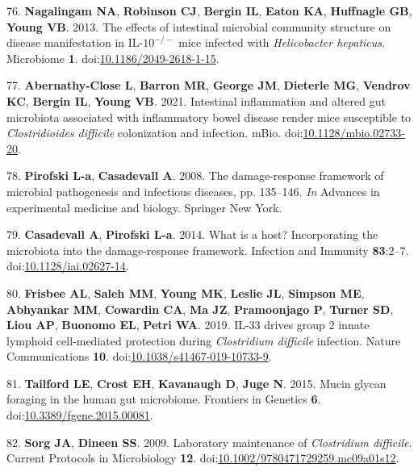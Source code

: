 \documentclass[
  12pt,
]{article}
\newenvironment{cslreferences}%
  {}%
  {\par}
\begin{document}
\begin{cslreferences}
\leavevmode\hypertarget{ref-Nagalingam2013}{}%
76. \textbf{Nagalingam NA}, \textbf{Robinson CJ}, \textbf{Bergin IL},
\textbf{Eaton KA}, \textbf{Huffnagle GB}, \textbf{Young VB}. 2013. The
effects of intestinal microbial community structure on disease
manifestation in IL-\(10^{-/-}\) mice infected with \emph{Helicobacter
hepaticus}. Microbiome \textbf{1}.
doi:\href{https://doi.org/10.1186/2049-2618-1-15}{10.1186/2049-2618-1-15}.

\leavevmode\hypertarget{ref-AbernathyClose2021}{}%
77. \textbf{Abernathy-Close L}, \textbf{Barron MR}, \textbf{George JM},
\textbf{Dieterle MG}, \textbf{Vendrov KC}, \textbf{Bergin IL},
\textbf{Young VB}. 2021. Intestinal inflammation and altered gut
microbiota associated with inflammatory bowel disease render mice
susceptible to \emph{Clostridioides difficile} colonization and
infection. mBio.
doi:\href{https://doi.org/10.1128/mbio.02733-20}{10.1128/mbio.02733-20}.

\leavevmode\hypertarget{ref-Pirofski2008}{}%
78. \textbf{Pirofski L-a}, \textbf{Casadevall A}. 2008. The
damage-response framework of microbial pathogenesis and infectious
diseases, pp. 135--146. \emph{In} Advances in experimental medicine and
biology. Springer New York.

\leavevmode\hypertarget{ref-Casadevall2014}{}%
79. \textbf{Casadevall A}, \textbf{Pirofski L-a}. 2014. What is a host?
Incorporating the microbiota into the damage-response framework.
Infection and Immunity \textbf{83}:2--7.
doi:\href{https://doi.org/10.1128/iai.02627-14}{10.1128/iai.02627-14}.

\leavevmode\hypertarget{ref-Frisbee2019}{}%
80. \textbf{Frisbee AL}, \textbf{Saleh MM}, \textbf{Young MK},
\textbf{Leslie JL}, \textbf{Simpson ME}, \textbf{Abhyankar MM},
\textbf{Cowardin CA}, \textbf{Ma JZ}, \textbf{Pramoonjago P},
\textbf{Turner SD}, \textbf{Liou AP}, \textbf{Buonomo EL}, \textbf{Petri
WA}. 2019. IL-33 drives group 2 innate lymphoid cell-mediated protection
during \emph{Clostridium difficile} infection. Nature Communications
\textbf{10}.
doi:\href{https://doi.org/10.1038/s41467-019-10733-9}{10.1038/s41467-019-10733-9}.

\leavevmode\hypertarget{ref-Tailford2015}{}%
81. \textbf{Tailford LE}, \textbf{Crost EH}, \textbf{Kavanaugh D},
\textbf{Juge N}. 2015. Mucin glycan foraging in the human gut
microbiome. Frontiers in Genetics \textbf{6}.
doi:\href{https://doi.org/10.3389/fgene.2015.00081}{10.3389/fgene.2015.00081}.

\leavevmode\hypertarget{ref-Sorg2009}{}%
82. \textbf{Sorg JA}, \textbf{Dineen SS}. 2009. Laboratory maintenance
of \emph{Clostridium difficile}. Current Protocols in Microbiology
\textbf{12}.
doi:\href{https://doi.org/10.1002/9780471729259.mc09a01s12}{10.1002/9780471729259.mc09a01s12}.


\end{cslreferences}
\end{document}
